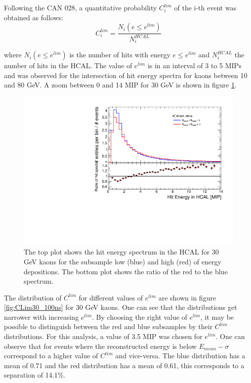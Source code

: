 Following the CAN 028, a quantitative probability $C_{i}^{lim}$ of the i-th event was obtained as follows:
\begin{equation}
  C_{i}^{lim} = \frac{N_{i}(e \leq e^{lim})}{N_{i}^{HCAL}}
\end{equation}

where $N_{i}(e \leq e^{lim})$ is the number of hits with energy $e \leq e^{lim}$ and $N_{i}^{HCAL}$ the number of hits in the HCAL. The value of $e^{lim}$ is in an interval of 3 to 5 MIPs and was observed for the intersection of hit energy spectra for kaons between 10 and 80 GeV. A zoom between 0 and 14 MIP for 30 GeV is shown in figure \ref{fig:HitSpectra30_Zoom_100ns}.

\begin{figure}[htbp!]
  \centering
  \includegraphics[width=0.7\linewidth]{../Thesis_Plots/ILD/AdditionalPlots/Plots/HitEnergySpectra_Zoom_100ns_30GeV.pdf}
  \caption{The top plot shows the hit energy spectrum in the HCAL for 30 GeV kaons for the subsample low (blue) and high (red) of energy depositions. The bottom plot shows the ratio of the red to the blue spectrum.} \label{fig:HitSpectra30_Zoom_100ns}
\end{figure}

The distribution of $C^{lim}$ for different values of $e^{lim}$ are shown in figure \ref{fig:CLim30_100ns} for 30 GeV kaons. One can see that the distributions get narrower with increasing $e^{lim}$. By choosing the right value of $e^{lim}$, it may be possible to distinguish between the red and blue subsamples by their $C^{lim}$ distributions. For this analysis, a value of 3.5 MIP was chosen for $e^{lim}$. One can observe that for events where the reconstructed energy is below $E_{mean} - \sigma$ correspond to a higher value of $C^{lim}$ and vice-versa. The blue distribution has a mean of 0.71 and the red distribution has a mean of 0.61, this corresponds to a separation of 14.1\%.

